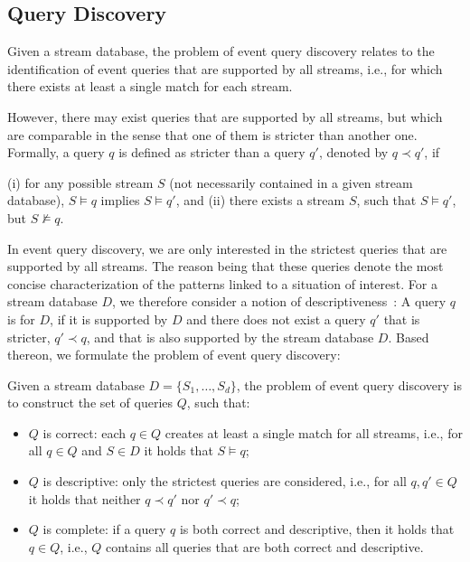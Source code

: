 \subsection{Query Discovery}
\label{sec:discovery}

Given a stream database, the problem of event query discovery relates to
the identification of event queries that are supported by all streams, i.e., for
which there exists at least a single match for each stream.

However, there may exist queries that are
supported
by all streams, but which are comparable in the sense that one of them
is stricter than another one. Formally, a query $q$ is defined as stricter
than a query $q'$, denoted by $q\prec q'$, if

(i) for any possible stream $S$ (not necessarily contained in a given stream
database), $S \models q$ implies $S
\models q'$, and (ii) there exists a stream $S$, such that $S \models q'$,
but $S \not\models q$.

In event query discovery, we are only interested in the strictest queries
that are supported by all streams. The reason being that these queries
denote the most {concise} characterization of the
patterns linked to a situation of interest. For a stream database $D$, we
therefore
consider a notion of descriptiveness~\cite{icdt2022}: A query $q$ is
 for $D$,
if it is supported by $D$ and
there does not exist a query $q'$ that is stricter, $q'\prec q$, and that is
also supported by the stream database $D$.
Based thereon, we formulate the problem of event query discovery:

\begin{problem}
\label{problem}
Given a stream database $D=\{S_1,\ldots, S_d\}$,
the problem of event query discovery is to construct the set of queries $Q$,
such that:
\begin{itemize}[nosep,left=1em]
  \item ${Q}$ is correct: each $q\in Q$ creates at least a single match for
  all streams, i.e., for all $q\in Q$ and $S\in D$ it holds that $S \models
  q$;
  \item ${Q}$ is descriptive: only the strictest queries are considered,
  i.e., for all $q,q'\in Q$ it holds that neither $q\prec q'$ nor $q'\prec q$;
  \item ${Q}$ is complete: if a query $q$ is both correct and descriptive,
  then it holds that $q\in Q$, {i.e., ${Q}$ contains
  all queries
  that are both correct and descriptive.}
  \end{itemize}
\end{problem}

